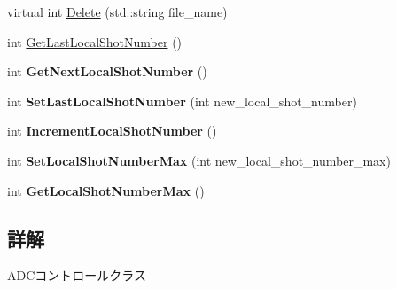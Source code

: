\begin{DoxyCompactItemize}
\item 
virtual int \hyperlink{class_t_k_a_d_c_c_o_n_t_r_o_l_afa385509f61162198950676d279f4c3c}{Delete} (std\+::string file\+\_\+name)
\item 
int \hyperlink{class_t_k_a_d_c_c_o_n_t_r_o_l_afbeba1999b1d5afeda2d3b755d20b2ce}{Get\+Last\+Local\+Shot\+Number} ()
\item 
\mbox{\label{class_t_k_a_d_c_c_o_n_t_r_o_l_a14b0bfaadfcc3a9e68000da38b34a9ce}} 
int {\bfseries Get\+Next\+Local\+Shot\+Number} ()
\item 
\mbox{\label{class_t_k_a_d_c_c_o_n_t_r_o_l_af2c1452b8d352d610fae97f3f545124b}} 
int {\bfseries Set\+Last\+Local\+Shot\+Number} (int new\+\_\+local\+\_\+shot\+\_\+number)
\item 
\mbox{\label{class_t_k_a_d_c_c_o_n_t_r_o_l_a424d3c2c41d077dbdc2af5d27e45f76e}} 
int {\bfseries Increment\+Local\+Shot\+Number} ()
\item 
\mbox{\label{class_t_k_a_d_c_c_o_n_t_r_o_l_ad75a36e7a3ff1555171addad9dfc1c68}} 
int {\bfseries Set\+Local\+Shot\+Number\+Max} (int new\+\_\+local\+\_\+shot\+\_\+number\+\_\+max)
\item 
\mbox{\label{class_t_k_a_d_c_c_o_n_t_r_o_l_a997ee62e77c15fc48bf9c7f4deee17f1}} 
int {\bfseries Get\+Local\+Shot\+Number\+Max} ()
\end{DoxyCompactItemize}


\subsection{詳解}
A\+D\+Cコントロールクラス

